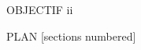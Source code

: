 \documentclass{beamer}
\begin{document}
\maketitle
\placelogotrue

\begin{frame}{OBJECTIF}
    ii
\end{frame}
{\placelogofalse
\begin{frame}{PLAN}
  [sections numbered]
    \textbf{
      \tableofcontents[hideallsubsections]
    }
\end{frame}
}

% 
% 
%






\end{document}
